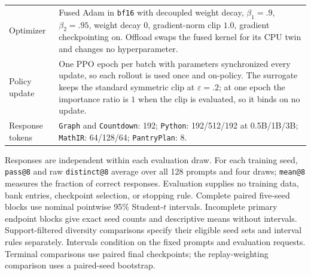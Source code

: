 \documentclass{article}
\newcommand{\1}{\mathbf 1}
\theoremstyle{remark}
\theoremstyle{definition}
\theoremstyle{plain}
\begin{document}
\begin{table}[!htbp]
\begin{tabularx}{\linewidth}{@{}P{.23\linewidth}Y@{}}
    Optimizer & Fused Adam in \texttt{bf16} with decoupled weight decay,
      $\beta_1=.9$, $\beta_2=.95$, weight decay $0$, gradient-norm clip $1.0$,
      gradient checkpointing on. Offload swaps the fused kernel for its CPU
      twin and changes no hyperparameter. \\
    Policy update & One PPO epoch per batch with parameters synchronized every
      update, so each rollout is used once and on-policy. The surrogate keeps
      the standard symmetric clip at $\varepsilon=.2$; at one epoch the
      importance ratio is $1$ when the clip is evaluated, so it binds on no
      update. \\
    Response tokens & \texttt{Graph} and \texttt{Countdown}: 192; \texttt{Python}: 192/512/192
      at 0.5B/1B/3B; \texttt{MathIR}: 64/128/64; \texttt{PantryPlan}: 8. \\
    \bottomrule
  \end{tabularx}
\end{table}



Responses are independent within each evaluation draw. For each training
seed, \texttt{pass@8} and raw \texttt{distinct@8} average over all 128 prompts
and four draws; \texttt{mean@8} measures the fraction of correct responses.
Evaluation supplies no training data, bank entries, checkpoint selection, or
stopping rule. Complete paired five-seed blocks use nominal pointwise 95\%
Student-$t$ intervals. Incomplete primary endpoint blocks give exact seed
counts and descriptive means without intervals. Support-filtered diversity
comparisons specify their eligible seed sets and interval rules separately.
Intervals condition on the fixed prompts and evaluation requests. Terminal
comparisons use paired final checkpoints; the replay-weighting comparison
uses a paired-seed bootstrap.

\FloatBarrier
\end{document}
